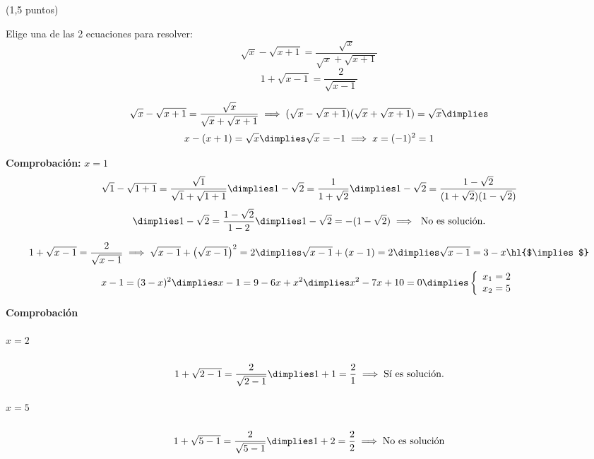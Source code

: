 \documentclass[palatino,nosec]{Docencia}
\newcommand{\cimplies}{\text{\hl{$\implies$}}}
\begin{document}
\begin{problem}(1,5 puntos)

Elige una de las 2 ecuaciones para resolver:
\ppart
\[
	\sqrt{x} - \sqrt{x+1} = \frac{\sqrt{x}}{\sqrt{x}+\sqrt{x+1}}
\]
\ppart 
\[
	1+\sqrt{x-1} = \frac{2}{\sqrt{x-1}}
\]
\solution

\spart 

\[
	\sqrt{x} - \sqrt{x+1} = \frac{\sqrt{x}}{\sqrt{x}+\sqrt{x+1}} \implies (\sqrt{x} - \sqrt{x+1})({\sqrt{x}+\sqrt{x+1}}) = \sqrt{x} \dimplies
\]
\[ 
	x-(x+1) = \sqrt{x} \dimplies \sqrt{x} = -1 \implies x=(-1)^2 = 1
\]

\textbf{Comprobación:} $x=1$ 
\[
\sqrt{1} - \sqrt{1+1} = \frac{\sqrt{1}}{\sqrt{1}+\sqrt{1+1}} \dimplies 1-\sqrt{2} = \frac{1}{1+\sqrt{2}} \dimplies 1-\sqrt{2} = \frac{1-\sqrt{2}}{(1+\sqrt{2})(1-\sqrt{2})}\]
\[
	\dimplies 1-\sqrt{2} = \frac{1-\sqrt{2}}{1-2}  \dimplies 1-\sqrt{2} = -(1-\sqrt{2})\implies \text{ No es solución.}
\]

\spart
\[
	1+\sqrt{x-1} = \frac{2}{\sqrt{x-1}} \implies \sqrt{x-1}+\left(\sqrt{x-1}\right)^2 = 2 \dimplies \sqrt{x-1} + (x-1) = 2 \dimplies \sqrt{x-1} = 3-x \cimplies\]
\[
	x-1 = (3-x)^2 \dimplies x-1=9-6x+x^2 \dimplies x^2-7x+10 = 0 \dimplies \left\{\begin{array}{c} x_1=2\\x_2=5\end{array}\right.
\]

\textbf{Comprobación}
\subparagraph{$x=2$}
\[
	1+\sqrt{2-1} = \frac{2}{\sqrt{2-1}} \dimplies 1+1=\frac{2}{1} \implies \text{Sí es solución.}
\]

\subparagraph{$x=5$}
\[
	1+\sqrt{5-1} = \frac{2}{\sqrt{5-1}} \dimplies 1+2=\frac{2}{2} \implies \text{No es solución}
\]
\end{problem}
\end{document}
